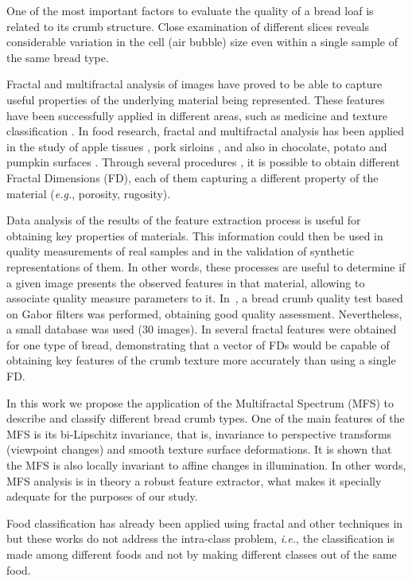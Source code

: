 \documentclass[twocolumn]{bmcart}%
\begin{document}
One of the most important factors to evaluate the quality of a bread loaf is related to its crumb structure. Close examination of different slices reveals considerable variation in the cell (air bubble) size even within a single sample of the same bread type. 

Fractal and multifractal analysis of images have pro\-ved to be able to capture useful properties of the underlying material being represented. These features have been successfully applied in different areas, such as medi\-cine \cite{Andjelkovic2008,Yu2011} and texture classification \cite{Wendt2009}. In food research, fractal and multifractal analysis has been applied in the study of apple tissues \cite{Mendoza2010}, pork sirloins \cite{Serrano2012}, and also in chocolate, potato and pumpkin surfaces \cite{Quevedo2002}. Through several procedures \cite{Peitgen2004,Gonzales2008}, it is possible to obtain different Fractal Dimensions (FD), each of them capturing a different property of the material ({\em e.g.}, porosity, rugosity).

Data analysis of the results of the feature extraction process is useful for obtaining key properties of materials. This information could then be used in quality measurements of real samples and in the validation of synthetic representations of them. In other words, these processes are useful to determine if a given image presents the observed features in that material, allowing to associate quality measure parameters to it. In~\cite{Fan2006}, a bread crumb quality test based on Gabor filters was performed, obtaining good quality assessment. Nevertheless, a small database was used ($30$ images). In \cite{Gonzales2008} several fractal features were obtained for one type of bread, demonstrating that a vector of FDs would be capable of obtaining key features of the crumb texture more accurately than using a single FD.

In this work we propose the application of the Multifractal Spectrum (MFS) to describe and classify different bread crumb types. One of the main features of the MFS is its bi-Lipschitz invariance, that is, invariance to perspective transforms (viewpoint changes) and smooth texture surface deformations. It is shown that the MFS is also locally invariant to affine changes in illumination. In other words, MFS analysis is in theory a robust feature extractor, what makes it specially adequate for the purposes of our study.

Food classification has already been applied using fractal and other techniques in \cite{Zong2010,Bosch2011} but these works do not address the intra-class problem, {\em i.e.}, the classification is made among different foods and not by making different classes out of the same food.
\end{document}
